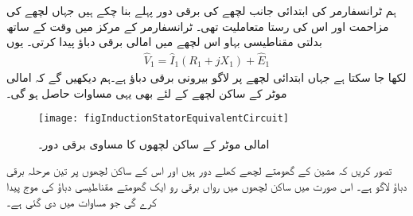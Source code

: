 ہم ٹرانسفارمر کی ابتدائی جانب لچھے کی برقی دور پہلے بنا چکے ہیں جہاں  لچھے کی مزاحمت  اور اس کی رستا متعاملیت   تھی۔ ٹرانسفارمر کے مرکز  میں وقت کے ساتھ بدلتی مقناطیسی بہاو اس لچھے میں امالی برقی دباؤ  پیدا کرتی۔ یوں 
\begin{align}
\hat{V}_1=\hat{I}_1 \left(R_1+j X_1 \right) +\hat{E}_1
\end{align}
لکھا جا سکتا ہے  جہاں  ابتدائی لچھے پر لاگو بیرونی برقی دباؤ ہے۔ہم دیکھیں گے کہ امالی موٹر کے ساکن لچھے کے لئے بھی یہی مساوات حاصل ہو گی۔
\begin{figure}
\centering
\texttt{[image: figInductionStatorEquivalentCircuit]}
\caption{امالی موٹر کے ساکن لچھوں کا مساوی برقی دور۔}
\label{شکل_امالی_ساکن_لچھوں_کی_مساوی_دور}
\end{figure}

 تصور کریں کہ مشین کے گھومتے لچھے کھلے دور ہیں اور اس کے ساکن لچھوں پر تین مرحلہ برقی دباؤ لاگو ہے۔ اس صورت میں ساکن لچھوں میں رواں برقی رو ایک گھومتے مقناطیسی دباؤ کی موج   پیدا کرے گی جو مساوات  میں دی گئی ہے۔

